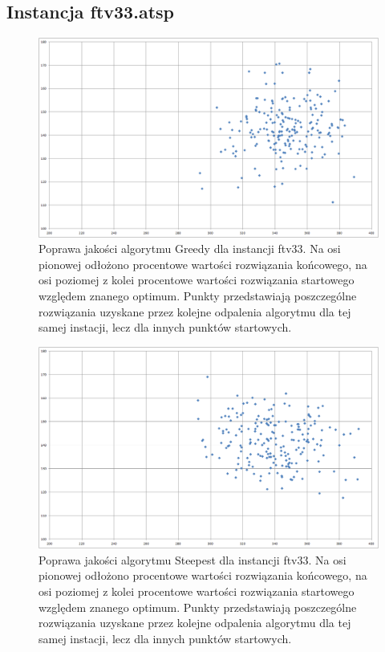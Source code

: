 \subsection{Instancja ftv33.atsp}
\begin{figure}[!h]
\centering\includegraphics[width=12cm]{img/ftv33_b2e_g.png}
\caption{Poprawa jakości algorytmu Greedy dla instancji ftv33. Na osi pionowej odłożono procentowe wartości rozwiązania końcowego, na osi poziomej z kolei procentowe wartości rozwiązania startowego względem znanego optimum. Punkty przedstawiają poszczególne rozwiązania uzyskane przez kolejne odpalenia algorytmu dla tej samej instacji, lecz dla innych punktów startowych.}\label{rys:ftv33g}
\end{figure}
\begin{figure}[!h]
\centering\includegraphics[width=12cm]{img/ftv33_b2e_s.png}
\caption{Poprawa jakości algorytmu Steepest dla instancji ftv33. Na osi pionowej odłożono procentowe wartości rozwiązania końcowego, na osi poziomej z kolei procentowe wartości rozwiązania startowego względem znanego optimum. Punkty przedstawiają poszczególne rozwiązania uzyskane przez kolejne odpalenia algorytmu dla tej samej instacji, lecz dla innych punktów startowych.}\label{rys:ftv33s}
\end{figure}


